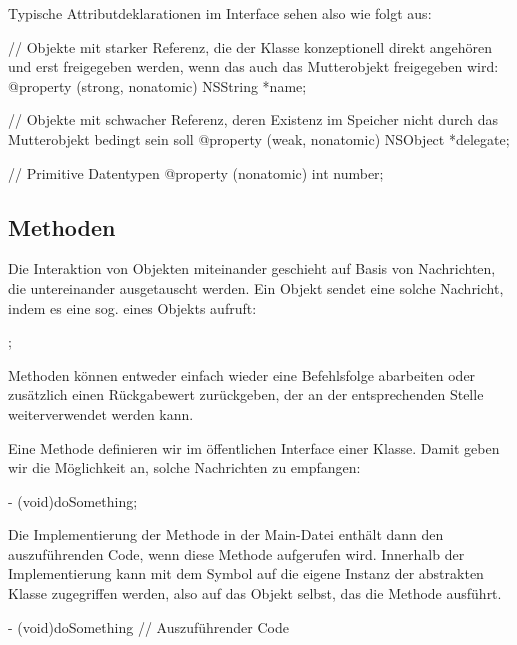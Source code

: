 \documentclass[parskip=half, final]{scrreprt}
\begin{document}
Typische Attributdeklarationen im Interface sehen also wie folgt aus:

\begin{objclst}
// Objekte mit starker Referenz, die der Klasse konzeptionell direkt angehören und erst freigegeben werden, wenn das auch das Mutterobjekt freigegeben wird:
@property (strong, nonatomic) NSString *name;
\end{objclst}

\begin{objclst}
// Objekte mit schwacher Referenz, deren Existenz im Speicher nicht durch das Mutterobjekt bedingt sein soll
@property (weak, nonatomic) NSObject *delegate;
\end{objclst}

\begin{objclst}
// Primitive Datentypen
@property (nonatomic) int number;
\end{objclst}

\subsection{Methoden}\label{sec:methoden}

Die Interaktion von Objekten miteinander geschieht auf Basis von Nachrichten, die untereinander ausgetauscht werden. Ein Objekt  sendet eine solche Nachricht, indem es eine sog.   eines Objekts  aufruft:
\begin{objclst}
;
\end{objclst}

Methoden können entweder einfach wieder eine Befehlsfolge abarbeiten oder zusätzlich einen Rückgabewert zurückgeben, der an der entsprechenden Stelle weiterverwendet werden kann.

Eine Methode definieren wir im öffentlichen Interface einer Klasse. Damit geben wir die Möglichkeit an, solche Nachrichten zu empfangen:
\begin{objclst}
- (void)doSomething;
\end{objclst}

Die Implementierung der Methode in der Main-Datei enthält dann den auszuführenden Code, wenn diese Methode aufgerufen wird. Innerhalb der Implementierung kann mit dem Symbol  auf die eigene Instanz der abstrakten Klasse zugegriffen werden, also auf das Objekt selbst, das die Methode ausführt.
\begin{objclst}
- (void)doSomething {
    // Auszuführender Code
}
\end{objclst}
\end{document}
